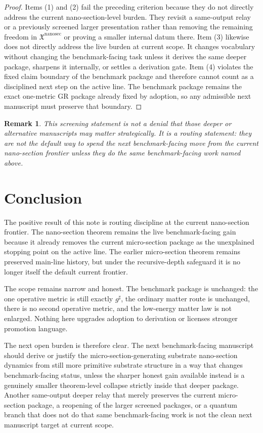 \documentclass[11pt]{article}
\newcommand{\CompletedMetric}{g^{\sharp}}
\newcommand{\NanoSectionPackage}{\mathfrak X^{\mathrm{nanosec}}}
\newtheorem{remark}{Remark}
\begin{document}
\begin{proof}
Items (1) and (2) fail the preceding criterion because they do not directly address the current nano-section-level burden. They revisit a same-output relay or a previously screened larger presentation rather than removing the remaining freedom in \(\NanoSectionPackage\) or proving a smaller internal datum there. Item (3) likewise does not directly address the live burden at current scope. It changes vocabulary without changing the benchmark-facing task unless it derives the same deeper package, sharpens it internally, or settles a derivation gate. Item (4) violates the fixed claim boundary of the benchmark package and therefore cannot count as a disciplined next step on the active line. The benchmark package remains the exact one-metric GR package already fixed by adoption, so any admissible next manuscript must preserve that boundary.
\end{proof}

\begin{remark}
This screening statement is not a denial that those deeper or alternative manuscripts may matter strategically. It is a routing statement: they are not the default way to spend the next benchmark-facing move from the current nano-section frontier unless they do the same benchmark-facing work named above.
\end{remark}

\section{Conclusion}

The positive result of this note is routing discipline at the current nano-section frontier. The nano-section theorem remains the live benchmark-facing gain because it already removes the current micro-section package as the unexplained stopping point on the active line. The earlier micro-section theorem remains preserved main-line history, but under the recursive-depth safeguard it is no longer itself the default current frontier.

The scope remains narrow and honest. The benchmark package is unchanged: the one operative metric is still exactly \(\CompletedMetric\), the ordinary matter route is unchanged, there is no second operative metric, and the low-energy matter law is not enlarged. Nothing here upgrades adoption to derivation or licenses stronger promotion language.

The next open burden is therefore clear. The next benchmark-facing manuscript should derive or justify the micro-section-generating substrate nano-section dynamics from still more primitive substrate structure in a way that changes benchmark-facing status, unless the sharper honest gain available instead is a genuinely smaller theorem-level collapse strictly inside that deeper package. Another same-output deeper relay that merely preserves the current micro-section package, a reopening of the larger screened packages, or a quantum branch that does not do that same benchmark-facing work is not the clean next manuscript target at current scope.
\end{document}
